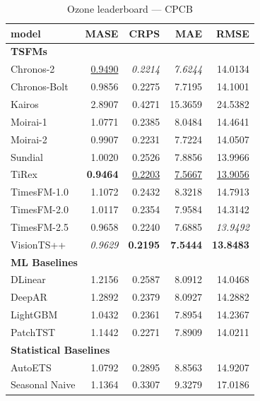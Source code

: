\begin{table}[H]
\caption{Ozone leaderboard --- CPCB}
\centering
\begin{small}
\begin{tabular}{lrrrr}
\toprule
model & MASE & CRPS & MAE & RMSE \\
\midrule
\multicolumn{5}{l}{\textbf{TSFMs}} \\
Chronos-2 & \underline{0.9490} & \textit{0.2214} & \textit{7.6244} & 14.0134 \\
Chronos-Bolt & 0.9856 & 0.2275 & 7.7195 & 14.1001 \\
Kairos & 2.8907 & 0.4271 & 15.3659 & 24.5382 \\
Moirai-1 & 1.0771 & 0.2385 & 8.0484 & 14.4641 \\
Moirai-2 & 0.9907 & 0.2231 & 7.7224 & 14.0507 \\
Sundial & 1.0020 & 0.2526 & 7.8856 & 13.9966 \\
TiRex & \textbf{0.9464} & \underline{0.2203} & \underline{7.5667} & \underline{13.9056} \\
TimesFM-1.0 & 1.1072 & 0.2432 & 8.3218 & 14.7913 \\
TimesFM-2.0 & 1.0117 & 0.2354 & 7.9584 & 14.3142 \\
TimesFM-2.5 & 0.9658 & 0.2240 & 7.6885 & \textit{13.9492} \\
VisionTS++ & \textit{0.9629} & \textbf{0.2195} & \textbf{7.5444} & \textbf{13.8483} \\
\midrule
\multicolumn{5}{l}{\textbf{ML Baselines}} \\
DLinear & 1.2156 & 0.2587 & 8.0912 & 14.0468 \\
DeepAR & 1.2892 & 0.2379 & 8.0927 & 14.2882 \\
LightGBM & 1.0432 & 0.2361 & 7.8954 & 14.2367 \\
PatchTST & 1.1442 & 0.2271 & 7.8909 & 14.0211 \\
\midrule
\multicolumn{5}{l}{\textbf{Statistical Baselines}} \\
AutoETS & 1.0792 & 0.2895 & 8.8563 & 14.9207 \\
Seasonal Naive & 1.1364 & 0.3307 & 9.3279 & 17.0186 \\
\bottomrule
\end{tabular}
\end{small}
\end{table}